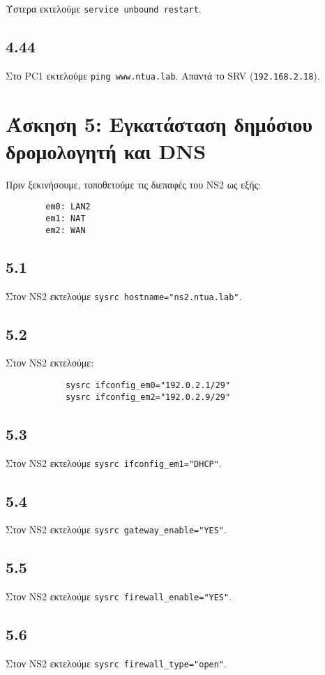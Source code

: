 \documentclass[a4paper, 12pt]{article}
\begin{document}
		Ύστερα εκτελούμε \verb|service unbound restart|.

	\subsection*{4.44}
		Στο PC1 εκτελούμε \verb|ping www.ntua.lab|. Απαντά το SRV (\verb|192.168.2.18|).

\section*{Άσκηση 5: Εγκατάσταση δημόσιου δρομολογητή και DNS}
	
	Πριν ξεκινήσουμε, τοποθετούμε τις διεπαφές του NS2 ως εξής:
	
	\begin{verbatim}
		em0: LAN2
		em1: NAT
		em2: WAN
	\end{verbatim}

	\subsection*{5.1}
		Στον NS2 εκτελούμε \verb|sysrc hostname="ns2.ntua.lab"|.

	\subsection*{5.2}
		Στον NS2 εκτελούμε:
		
		\begin{verbatim}
			sysrc ifconfig_em0="192.0.2.1/29"
			sysrc ifconfig_em2="192.0.2.9/29"
		\end{verbatim}

	\subsection*{5.3}
		Στον NS2 εκτελούμε \verb|sysrc ifconfig_em1="DHCP"|.

	\subsection*{5.4}
		Στον NS2 εκτελούμε \verb|sysrc gateway_enable="YES"|.

	\subsection*{5.5}
		Στον NS2 εκτελούμε \verb|sysrc firewall_enable="YES"|.

	\subsection*{5.6}
		Στον NS2 εκτελούμε \verb|sysrc firewall_type="open"|.
\end{document}
